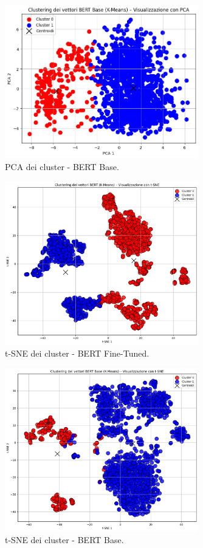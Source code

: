 \documentclass[a4paper,12pt]{article}
\begin{document}
\begin{figure}[htbp]
  \centering
  \includegraphics[width=0.75\textwidth]{3.png}
  \caption{PCA dei cluster - BERT Base.}
  \label{fig:pca_untuned}
\end{figure}

\begin{figure}[htbp]
  \centering
  \includegraphics[width=0.75\textwidth]{2.png}
  \caption{t-SNE dei cluster - BERT Fine-Tuned.}
  \label{fig:tsne_tuned}
\end{figure}

\begin{figure}[htbp]
  \centering
  \includegraphics[width=0.75\textwidth]{4.png}
  \caption{t-SNE dei cluster - BERT Base.}
  \label{fig:tsne_untuned}
\end{figure}
\end{document}
